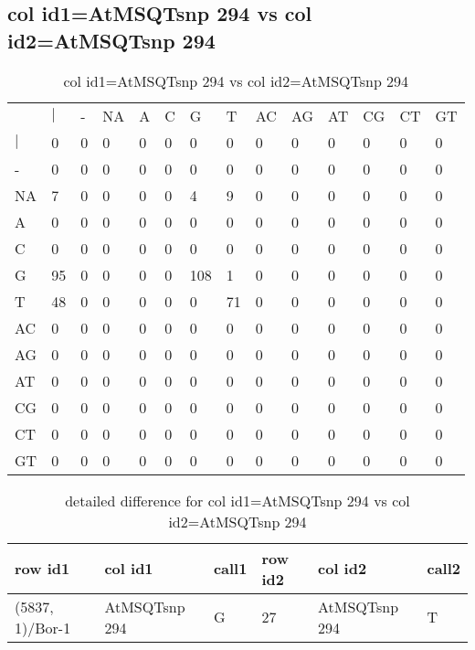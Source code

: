 \subsection{col id1=AtMSQTsnp 294 vs col id2=AtMSQTsnp 294}
\begin{center}
\begin{longtable}{|l|l|l|l|l|l|l|l|l|l|l|l|l|l|}
\caption{col id1=AtMSQTsnp 294 vs col id2=AtMSQTsnp 294} \label{table_dm836}\\
\hline
\\
\hline
&$|$&-&NA&A&C&G&T&AC&AG&AT&CG&CT&GT\\
$|$&0&0&0&0&0&0&0&0&0&0&0&0&0\\
-&0&0&0&0&0&0&0&0&0&0&0&0&0\\
NA&7&0&0&0&0&4&9&0&0&0&0&0&0\\
A&0&0&0&0&0&0&0&0&0&0&0&0&0\\
C&0&0&0&0&0&0&0&0&0&0&0&0&0\\
G&95&0&0&0&0&108&1&0&0&0&0&0&0\\
T&48&0&0&0&0&0&71&0&0&0&0&0&0\\
AC&0&0&0&0&0&0&0&0&0&0&0&0&0\\
AG&0&0&0&0&0&0&0&0&0&0&0&0&0\\
AT&0&0&0&0&0&0&0&0&0&0&0&0&0\\
CG&0&0&0&0&0&0&0&0&0&0&0&0&0\\
CT&0&0&0&0&0&0&0&0&0&0&0&0&0\\
GT&0&0&0&0&0&0&0&0&0&0&0&0&0\\
\hline
\end{longtable}
\end{center}

\begin{center}
\begin{longtable}{|l|l|l|l|l|l|}
\caption{detailed difference for col id1=AtMSQTsnp 294 vs col id2=AtMSQTsnp 294} \label{table_dm837}\\
\hline
row id1&col id1&call1&row id2&col id2&call2\\
\hline
(5837, 1)/Bor-1&AtMSQTsnp 294&G&27&AtMSQTsnp 294&T\\
\hline
\end{longtable}
\end{center}

